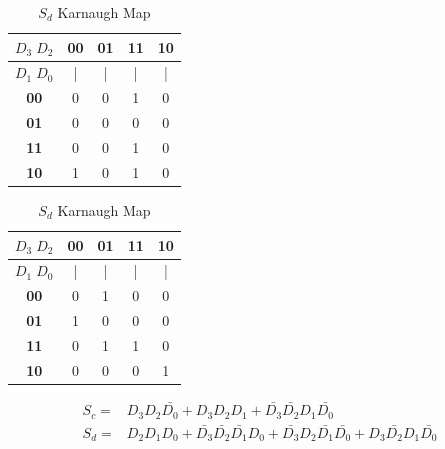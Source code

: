 \documentclass{article}
\begin{document}
\begin{table}[H]
  \centering
  \begin{minipage}{0.45\textwidth}
  \centering
  \begin{tabular}{|c|c|c|c|c|}
  \hline
  \textbf{$D_3 \; D_2$} & \textbf{00} & \textbf{01} & \textbf{11} & \textbf{10} \\
  \hline
  \textbf{$D_1 \; D_0$} & | & | & | & | \\
  \hline
  \textbf{00} & 0 & 0 & 1 & 0 \\
  \hline
  \textbf{01} & 0 & 0 & 0 & 0 \\
  \hline
  \textbf{11} & 0 & 0 & 1 & 0 \\
  \hline
  \textbf{10} & 1 & 0 & 1 & 0 \\
  \hline
  \end{tabular}
  \caption{$S_c$ Karnaugh Map}
  \end{minipage}
  \hfill
  \begin{minipage}{0.45\textwidth}
  \centering
  \begin{tabular}{|c|c|c|c|c|}
  \hline
  \textbf{$D_3 \; D_2$} & \textbf{00} & \textbf{01} & \textbf{11} & \textbf{10} \\
  \hline
  \textbf{$D_1 \; D_0$} & | & | & | & | \\
  \hline
  \textbf{00} & 0 & 1 & 0 & 0 \\
  \hline
  \textbf{01} & 1 & 0 & 0 & 0 \\
  \hline
  \textbf{11} & 0 & 1 & 1 & 0 \\
  \hline
  \textbf{10} & 0 & 0 & 0 & 1 \\
  \hline
  \end{tabular}
  \caption{$S_d$ Karnaugh Map}
  \end{minipage}
\end{table}
\begin{align*}
  S_c =& D_3D_2\bar{D_0}+D_3D_2D_1+\bar{D_3}\bar{D_2}D_1\bar{D_0}\\
  S_d =&D_2D_1D_0+\bar{D_3}\bar{D_2}\bar{D_1}D_0+\bar{D_3}D_2\bar{D_1}\bar{D_0}+D_3\bar{D_2}D_1\bar{D_0}
\end{align*}
\end{document}
